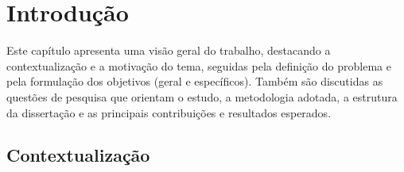 \chapter{Introdução}\label{cap:modelo}

Este capítulo apresenta uma visão geral do trabalho, destacando a contextualização e a motivação do tema, seguidas pela definição do problema e pela formulação dos objetivos (geral e específicos). Também são discutidas as questões de pesquisa que orientam o estudo, a metodologia adotada, a estrutura da dissertação e as principais contribuições e resultados esperados. 

\section{Contextualização}


